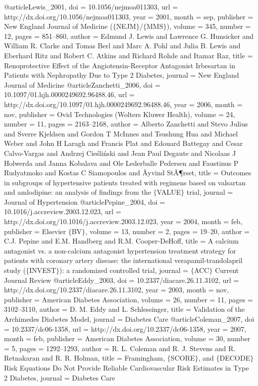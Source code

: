 @article{Lewis_2001,
	doi = {10.1056/nejmoa011303},
	url = {http://dx.doi.org/10.1056/nejmoa011303},
	year = 2001,
	month = {sep},
	publisher = {New England Journal of Medicine ($\lbrace$NEJM$\rbrace$/$\lbrace$MMS$\rbrace$)},
	volume = {345},
	number = {12},
	pages = {851--860},
	author = {Edmund J. Lewis and Lawrence G. Hunsicker and William R. Clarke and Tomas Berl and Marc A. Pohl and Julia B. Lewis and Eberhard Ritz and Robert C. Atkins and Richard Rohde and Itamar Raz},
	title = {Renoprotective Effect of the Angiotensin-Receptor Antagonist Irbesartan in Patients with Nephropathy Due to Type 2 Diabetes},
	journal = {New England Journal of Medicine}
}
@article{Zanchetti_2006,
	doi = {10.1097/01.hjh.0000249692.96488.46},
	url = {http://dx.doi.org/10.1097/01.hjh.0000249692.96488.46},
	year = 2006,
	month = {nov},
	publisher = {Ovid Technologies (Wolters Kluwer Health)},
	volume = {24},
	number = {11},
	pages = {2163--2168},
	author = {Alberto Zanchetti and Stevo Julius and Sverre Kjeldsen and Gordon T McInnes and Tsushung Hua and Michael Weber and John H Laragh and Francis Plat and Edouard Battegay and Cesar Calvo-Vargas and Andrzej Cie{\'{s}}li{\'{n}}ski and Jean Paul Degaute and Nicolaas J Holwerda and Janna Kobalava and Ole Lederballe Pedersen and Faustinus P Rudyatmoko and Kostas C Siamopoulos and Ãyvind StÃ¶rset},
	title = {Outcomes in subgroups of hypertensive patients treated with regimens based on valsartan and amlodipine: an analysis of findings from the $\lbrace$VALUE$\rbrace$ trial},
	journal = {Journal of Hypertension}
}
@article{Pepine_2004,
	doi = {10.1016/j.accreview.2003.12.023},
	url = {http://dx.doi.org/10.1016/j.accreview.2003.12.023},
	year = 2004,
	month = {feb},
	publisher = {Elsevier $\lbrace$BV$\rbrace$},
	volume = {13},
	number = {2},
	pages = {19--20},
	author = {C.J. Pepine and E.M. Handberg and R.M. Cooper-DeHoff},
	title = {A calcium antagonist vs. a non-calcium antagonist hypertension treatment strategy for patients with coronary artery disease: the international verapamil-trandolapril study ($\lbrace$INVEST$\rbrace$): a randomized controlled trial},
	journal = {$\lbrace$ACC$\rbrace$ Current Journal Review}
}
@article{Eddy_2003,
	doi = {10.2337/diacare.26.11.3102},
	url = {http://dx.doi.org/10.2337/diacare.26.11.3102},
	year = 2003,
	month = {nov},
	publisher = {American Diabetes Association},
	volume = {26},
	number = {11},
	pages = {3102--3110},
	author = {D. M. Eddy and L. Schlessinger},
	title = {Validation of the Archimedes Diabetes Model},
	journal = {Diabetes Care}
}
@article{Coleman_2007,
	doi = {10.2337/dc06-1358},
	url = {http://dx.doi.org/10.2337/dc06-1358},
	year = 2007,
	month = {feb},
	publisher = {American Diabetes Association},
	volume = {30},
	number = {5},
	pages = {1292--1293},
	author = {R. L. Coleman and R. J. Stevens and R. Retnakaran and R. R. Holman},
	title = {Framingham, $\lbrace$SCORE$\rbrace$, and $\lbrace$DECODE$\rbrace$ Risk Equations Do Not Provide Reliable Cardiovascular Risk Estimates in Type 2 Diabetes},
	journal = {Diabetes Care}
}
